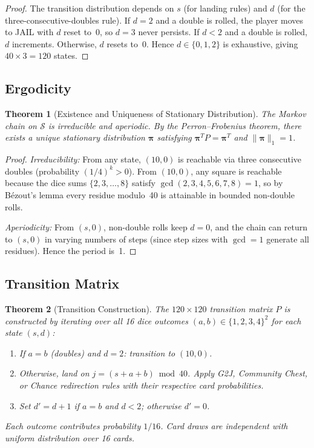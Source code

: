 \documentclass[12pt]{article}
\newtheorem{theorem}{Theorem}
\begin{document}
\begin{proof}
The transition distribution depends on $s$ (for landing rules) and $d$ (for the three-consecutive-doubles rule). If $d = 2$ and a double is rolled, the player moves to JAIL with $d$ reset to~0, so $d = 3$ never persists. If $d < 2$ and a double is rolled, $d$ increments. Otherwise, $d$ resets to~0. Hence $d \in \{0, 1, 2\}$ is exhaustive, giving $40 \times 3 = 120$ states.
\end{proof}

\subsection{Ergodicity}

\begin{theorem}[Existence and Uniqueness of Stationary Distribution]
The Markov chain on $\mathcal{S}$ is irreducible and aperiodic. By the Perron--Frobenius theorem, there exists a unique stationary distribution $\boldsymbol{\pi}$ satisfying $\boldsymbol{\pi}^T P = \boldsymbol{\pi}^T$ and $\|\boldsymbol{\pi}\|_1 = 1$.
\end{theorem}

\begin{proof}
\emph{Irreducibility:} From any state, $(10, 0)$ is reachable via three consecutive doubles (probability $(1/4)^k > 0$). From $(10, 0)$, any square is reachable because the dice sums $\{2, 3, \ldots, 8\}$ satisfy $\gcd(2,3,4,5,6,7,8) = 1$, so by B\'{e}zout's lemma every residue modulo~40 is attainable in bounded non-double rolls.

\emph{Aperiodicity:} From $(s, 0)$, non-double rolls keep $d = 0$, and the chain can return to $(s, 0)$ in varying numbers of steps (since step sizes with $\gcd = 1$ generate all residues). Hence the period is~1.
\end{proof}

\subsection{Transition Matrix}

\begin{theorem}[Transition Construction]
The $120 \times 120$ transition matrix $P$ is constructed by iterating over all 16 dice outcomes $(a,b) \in \{1,2,3,4\}^2$ for each state $(s,d)$:
\begin{enumerate}
    \item If $a = b$ (doubles) and $d = 2$: transition to $(10, 0)$.
    \item Otherwise, land on $j = (s + a + b) \bmod 40$. Apply G2J, Community Chest, or Chance redirection rules with their respective card probabilities.
    \item Set $d' = d + 1$ if $a = b$ and $d < 2$; otherwise $d' = 0$.
\end{enumerate}
Each outcome contributes probability $1/16$. Card draws are independent with uniform distribution over 16 cards.
\end{theorem}
\end{document}
